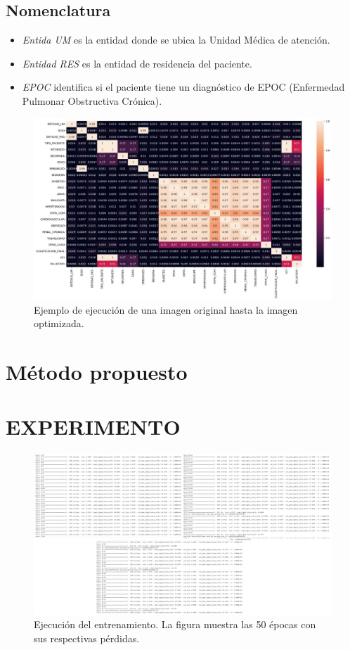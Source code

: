 \documentclass[a4paper,
               ]{jacow}
\begin{document}
\subsection{Nomenclatura}

\begin{itemize}[label=--]
\item \emph{Entida UM} es la entidad donde se ubica la Unidad Médica de atención.
\item \emph{Entidad RES} es la entidad de residencia del paciente.
\item \emph{EPOC} identifica si el paciente tiene un diagnóstico de EPOC (Enfermedad Pulmonar Obstructiva Crónica).
\end{itemize}

\begin{figure}[!h]
    \centering
    \includegraphics*[width=.5\textwidth]{matrizdeCorrelacion}
    \caption{Ejemplo de ejecución de una imagen original hasta la imagen optimizada.}
    \label{fig:matrix_correlacion}
\end{figure}

\section{Método propuesto}


\section{EXPERIMENTO}


\begin{figure}[!h]
    \centering
    \includegraphics*[width=.9\textwidth]{entrenamiento}
    \caption{Ejecución del entrenamiento. La figura muestra las 50 épocas con sus respectivas pérdidas.     }
    \label{fig:ejem_Entrenamiento}
\end{figure}
\end{document}
